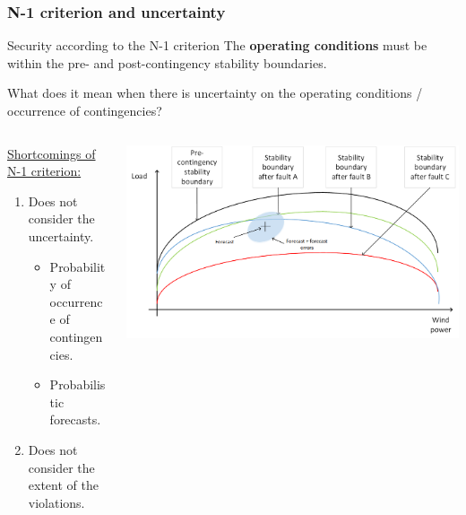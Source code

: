 \documentclass{beamer}
\begin{document}
\begin{frame}
\end{frame}

\begin{frame}
  \frametitle{N-1 criterion and uncertainty}
\begin{block}{Security according to the N-1 criterion}
The \textbf{operating conditions} must be within the pre- and post-contingency stability boundaries.
\end{block}
What does it mean when there is uncertainty on the operating conditions / occurrence of contingencies?
\vskip0.2cm
\begin{columns}
  \begin{column}{0.45\textwidth}
  \underline{Shortcomings of N-1 criterion:}
  \begin{enumerate}
  \item<1-2> Does not consider the uncertainty.
    \begin{itemize}
    \item Probability of occurrence of contingencies.
    \item Probabilistic forecasts.
    \end{itemize}
  \item<1> Does not consider the extent of the violations.
  \end{enumerate}    
  \end{column}
  \begin{column}{0.55\textwidth}
\includegraphics[width=1.1\textwidth]{Figs/StabBound-with-prob-forecast.png}
  \end{column}
\end{columns}
\end{frame}
\end{document}
